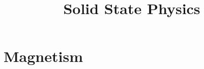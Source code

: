\documentclass[11pt,a4paper]{book}
\title{Solid State Physics}
\begin{document}
\maketitle
\chapter{Magnetism}

\end{document}
